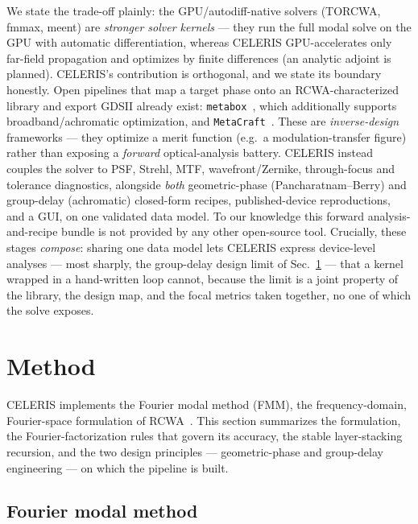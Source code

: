 \documentclass[preprint,12pt]{elsarticle}
\begin{document}
We state the trade-off plainly: the GPU/autodiff-native solvers (TORCWA, fmmax, meent)
are \emph{stronger solver kernels} --- they run the full modal solve on the GPU with
automatic differentiation, whereas CELERIS GPU-accelerates only far-field propagation
and optimizes by finite differences (an analytic adjoint is planned). CELERIS's contribution is orthogonal, and we state its boundary honestly. Open
pipelines that map a target phase onto an RCWA-characterized library and export GDSII
already exist: \texttt{metabox}~\cite{metabox}, which additionally supports
broadband/achromatic optimization, and \texttt{MetaCraft}~\cite{metacraft}. These are
\emph{inverse-design} frameworks --- they optimize a merit function (e.g.\ a
modulation-transfer figure) rather than exposing a \emph{forward} optical-analysis
battery. CELERIS instead couples the solver to PSF, Strehl, MTF, wavefront/Zernike,
through-focus and tolerance diagnostics, alongside \emph{both} geometric-phase
(Pancharatnam--Berry) and group-delay (achromatic) closed-form recipes,
published-device reproductions, and a GUI, on one validated data model. To our
knowledge this forward analysis-and-recipe bundle is not provided by any other
open-source tool. Crucially, these stages \emph{compose}: sharing one data model lets CELERIS
express device-level analyses --- most sharply, the group-delay design limit of
Sec.~\ref{sec:method} --- that a kernel wrapped in a hand-written loop cannot, because the
limit is a joint property of the library, the design map, and the focal metrics taken
together, no one of which the solve exposes.

\section{Method}
\label{sec:method}

CELERIS implements the Fourier modal method (FMM), the frequency-domain,
Fourier-space formulation of RCWA~\cite{moharam1981,moharam1995}. This section
summarizes the formulation, the Fourier-factorization rules that govern its
accuracy, the stable layer-stacking recursion, and the two design principles ---
geometric-phase and group-delay engineering --- on which the pipeline is built.

\subsection{Fourier modal method}
\end{document}
